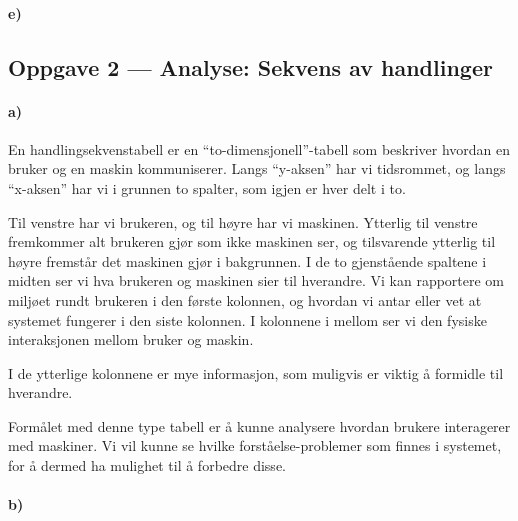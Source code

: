 \documentclass{../../myassignment}
\begin{document}
	\paragraph*{e)}


	\subsection*{Oppgave 2 --- Analyse: Sekvens av handlinger}
	\paragraph*{a)}
	En handlingsekvenstabell er en ``to-dimensjonell''-tabell som beskriver hvordan en bruker og en maskin kommuniserer. Langs ``y-aksen'' har vi tidsrommet, og langs ``x-aksen'' har vi i grunnen to spalter, som igjen er hver delt i to.

	Til venstre har vi brukeren, og til h{\o}yre har vi maskinen. Ytterlig til venstre fremkommer alt brukeren gj{\o}r som ikke maskinen ser, og tilsvarende ytterlig til h{\o}yre fremst{\aa}r det maskinen gj{\o}r i bakgrunnen. I de to gjenst{\aa}ende spaltene i midten ser vi hva brukeren og maskinen sier til hverandre. Vi kan rapportere om miljøet rundt brukeren i den første kolonnen, og hvordan vi antar eller vet at systemet fungerer i den siste kolonnen. I kolonnene i mellom ser vi den fysiske interaksjonen mellom bruker og maskin.

	I de ytterlige kolonnene er mye informasjon, som muligvis er viktig {\aa} formidle til hverandre.

	Form{\aa}let med denne type tabell er \aa{} kunne analysere hvordan brukere interagerer med maskiner. Vi vil kunne se hvilke forst{\aa}else-problemer som finnes i systemet, for {\aa} dermed ha mulighet til {\aa} forbedre disse.

	\newpage

	\paragraph*{b)}  %
\end{document}
